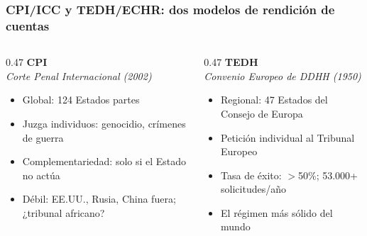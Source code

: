 \begin{frame}
\frametitle{CPI/ICC y TEDH/ECHR: dos modelos de rendición de cuentas}
\centering

\begin{columns}[T]
  \begin{column}{0.47\textwidth}
    \centering
    \textbf{\textcolor{accent}{CPI}} \\
    \textit{\scriptsize Corte Penal Internacional (2002)}
    \vspace{6pt}
    \begin{itemize}
      \item Global: 124 Estados partes
      \item Juzga individuos: genocidio, crímenes de guerra
      \item Complementariedad: solo si el Estado no actúa
      \item Débil: EE.UU., Rusia, China fuera; ¿tribunal africano?
    \end{itemize}
  \end{column}
  \begin{column}{0.47\textwidth}
    \centering
    \textbf{\textcolor{accent2}{TEDH}} \\
    \textit{\scriptsize Convenio Europeo de DDHH (1950)}
    \vspace{6pt}
    \begin{itemize}
      \item Regional: 47 Estados del Consejo de Europa
      \item Petición individual al Tribunal Europeo
      \item Tasa de éxito: $>$50\%; 53.000+ solicitudes/año
      \item El régimen más sólido del mundo
    \end{itemize}
  \end{column}
\end{columns}

\vspace{10pt}

\end{frame}
